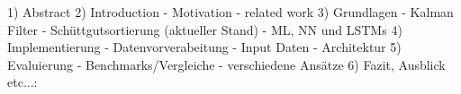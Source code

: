 1) Abstract 
2) Introduction
	- Motivation
	- related work
3) Grundlagen
	- Kalman Filter
	- Schüttgutsortierung (aktueller Stand)
	- ML, NN und LSTMs
4) Implementierung
	- Datenvorverabeitung
	- Input Daten
	- Architektur
5) Evaluierung
	- Benchmarks/Vergleiche
	- verschiedene Ansätze
6) Fazit, Ausblick etc...: